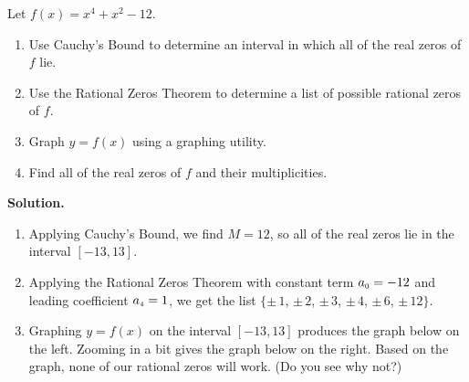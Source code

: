 \documentclass{ximera}
\begin{document}
\begin{example}  \label{polyquadinform} Let $f(x) = x^4 + x^2 - 12$.

\begin{enumerate}

\item  Use Cauchy's Bound to determine an interval in which all of the real zeros of $f$ lie.

\item  Use the Rational Zeros Theorem to determine a list of possible rational zeros of $f$.

\item  Graph $y=f(x)$ using a graphing utility.

\item  Find all of the real zeros of $f$ and their multiplicities.


\end{enumerate}

{\bf Solution.}

\begin{enumerate}

\item  Applying Cauchy's Bound, we find $M = 12$, so all of the real zeros lie in the interval $[-13,13]$.

\item  Applying the Rational Zeros Theorem with constant term $a_{\mbox{\tiny$0$}} = -12$ and leading coefficient $a_{\mbox{\tiny$4$}} = 1$, we get the list $\{\pm \, 1$, $\pm \, 2$, $\pm \, 3$, $\pm \, 4$, $\pm \, 6$, $\pm \, 12\}$.

\item  Graphing $y=f(x)$ on the interval $[-13,13]$ produces the graph below on the left.  Zooming in a bit gives the graph below on the right.  Based on the graph, none of our rational zeros will work. (Do you see why not?)


\begin{center}

\begin{tabular}{cc}


\end{tabular}
\end{center}
\end{enumerate}
\end{example}
\end{document}
